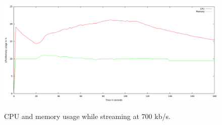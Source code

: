 \begin{center}
\begin{figure}[h]
	\centering
	\mbox{\includegraphics[width=1.2\textwidth]{Images/700kbs.png}}
	\label{graph:700kbs}
	\caption{CPU and memory usage while streaming at 700 kb/s.}
\end{figure}
\end{center}
